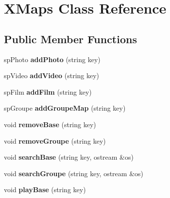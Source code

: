 \hypertarget{class_x_maps}{}\section{X\+Maps Class Reference}
\label{class_x_maps}
\subsection*{Public Member Functions}
\begin{DoxyCompactItemize}
\item 
sp\+Photo {\bfseries add\+Photo} (string key)\hypertarget{class_x_maps_a1f18863c96ddb7cd210d59c2b59846c6}{}\label{class_x_maps_a1f18863c96ddb7cd210d59c2b59846c6}

\item 
sp\+Video {\bfseries add\+Video} (string key)\hypertarget{class_x_maps_ac91c419ae96c6335606a4e840e1eeadc}{}\label{class_x_maps_ac91c419ae96c6335606a4e840e1eeadc}

\item 
sp\+Film {\bfseries add\+Film} (string key)\hypertarget{class_x_maps_a7364d8cfd45a1575d0d2cbf8bd53edef}{}\label{class_x_maps_a7364d8cfd45a1575d0d2cbf8bd53edef}

\item 
sp\+Groupe {\bfseries add\+Groupe\+Map} (string key)\hypertarget{class_x_maps_a648a31f57c14f71144822955c608ae8b}{}\label{class_x_maps_a648a31f57c14f71144822955c608ae8b}

\item 
void {\bfseries remove\+Base} (string key)\hypertarget{class_x_maps_a330f1b77f89e5707d210bc6f6ee3a12d}{}\label{class_x_maps_a330f1b77f89e5707d210bc6f6ee3a12d}

\item 
void {\bfseries remove\+Groupe} (string key)\hypertarget{class_x_maps_aca8175e95bf520bfe67cb6d9632ae481}{}\label{class_x_maps_aca8175e95bf520bfe67cb6d9632ae481}

\item 
void {\bfseries search\+Base} (string key, ostream \&os)\hypertarget{class_x_maps_adb1054a64b0bf297d9ddd5e5ce59a33e}{}\label{class_x_maps_adb1054a64b0bf297d9ddd5e5ce59a33e}

\item 
void {\bfseries search\+Groupe} (string key, ostream \&os)\hypertarget{class_x_maps_a5133e8a7a2ff162b7b984510be80efca}{}\label{class_x_maps_a5133e8a7a2ff162b7b984510be80efca}

\item 
void {\bfseries play\+Base} (string key)\hypertarget{class_x_maps_aa95ef3f9ad5257840d85e00c1d6d8778}{}\label{class_x_maps_aa95ef3f9ad5257840d85e00c1d6d8778}


\end{DoxyCompactItemize}
